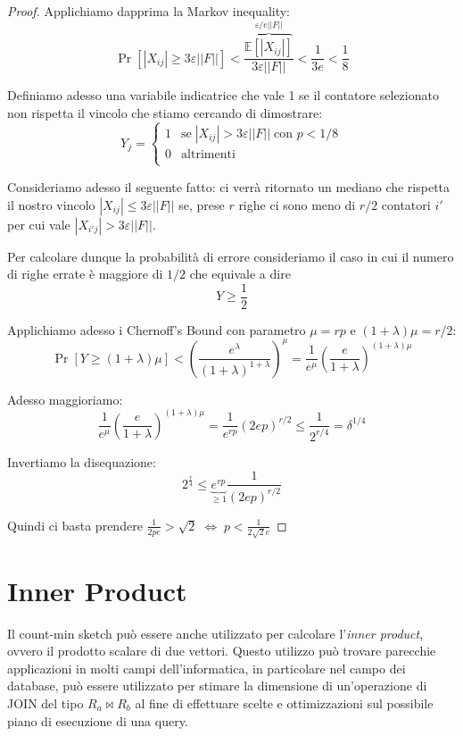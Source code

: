 \documentclass[a4paper,11pt]{book}
\begin{document}
\begin{proof}
Applichiamo dapprima la Markov inequality:
$$ \Pr[|X_{ij}| \geq 3 \varepsilon ||F||] < \frac{\overbrace{\mathbb{E}[|X_{ij}|]}^{\varepsilon / e||F||}}{3 \varepsilon ||F||} < \frac{1}{3e} < \frac{1}{8	}$$

Definiamo adesso una variabile indicatrice che vale 1 se il contatore selezionato non rispetta il vincolo che stiamo cercando di dimostrare:
$$ Y_j = \begin{cases} 1 & \mbox{se} \; |X_{ij}| > 3\varepsilon ||F|| \; \mbox{con } p < 1/8 \\
0 & \mbox{altrimenti}\\ \end{cases}$$

Consideriamo adesso il seguente fatto: ci verr\`a ritornato un mediano che rispetta il nostro vincolo $ |X_{ij}| \leq 3 \varepsilon ||F||$ se, prese $r$ righe ci sono meno di $r/2$ contatori $i'$ per cui vale $ |X_{i'j}| > 3 \varepsilon ||F||$.

Per calcolare dunque la probabilit\`a di errore consideriamo il caso in cui il numero di righe errate \`e maggiore di $1/2$ che equivale a dire $$Y \geq \frac{1}{2}$$

Applichiamo adesso i Chernoff's Bound con parametro $\mu = rp$ e $(1 + \lambda)\mu = r/2$:
$$\Pr[Y \geq (1 + \lambda)\mu] < \left( \frac{e^{\lambda}}{(1+\lambda)^{1+\lambda}}\right)^{\mu} =   \frac{1}{e^{\mu}}\left( \frac{e}{1+\lambda}\right)^{(1+\lambda)\mu}$$

Adesso maggioriamo:
$$\frac{1}{e^{\mu}}\left( \frac{e}{1+\lambda}\right)^{(1+\lambda)\mu} = \frac{1}{e^{rp}}\left( 2ep\right)^{r/2} \leq \frac{1}{2^{r/4}} = \delta^{1/4} $$

Invertiamo la disequazione:
$$2^{\frac{r}{4}} \leq \underbrace{e^{rp}}_{\geq 1}\frac{1}{(2ep)^{r/2}} $$

Quindi ci basta prendere $\frac{1}{2pe} > \sqrt{2} \; \Leftrightarrow \; p < \frac{1}{2\sqrt{2} e}$
\end{proof}

\section{Inner Product}

Il count-min sketch pu\`o essere anche utilizzato per calcolare l'\emph{inner product}, ovvero il prodotto scalare di due vettori. Questo utilizzo pu\`o trovare parecchie applicazioni in molti campi dell'informatica, in particolare nel campo dei database, pu\`o essere utilizzato per stimare la dimensione di un'operazione di \textsf{JOIN} del tipo $R_a \bowtie R_b$ al fine di effettuare scelte e ottimizzazioni sul possibile piano di esecuzione di una query.
\end{document}
